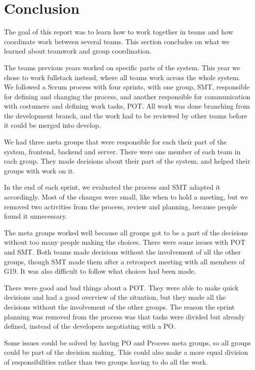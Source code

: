 \section{Conclusion}
The goal of this report was to learn how to work together in teams and how coordinate work between several teams. This section concludes on what we learned about teamwork and group coordination. 

The teams previous years worked on specific parts of the system. This year we chose to work fullstack instead, where all teams work across the whole system. We followed a Scrum process with four sprints, with one group, \gls{SMT}, responsible for defining and changing the process, and another responsible for communication with costumers and defining work tasks, \gls{POT}. All work was done branching from the development branch, and the work had to be reviewed by other teams before it could be merged into develop. 

We had three meta groups that were responsible for each their part of the system, frontend, backend and server. There were one member of each team in each group. They made decisions about their part of the system, and helped their groups with work on it. 

In the end of each sprint, we evaluated the process and \gls{SMT} adapted it accordingly. Most of the changes were small, like when to hold a meeting, but we removed two activities from the process, review and planning, because people found it unnecessary. 

The meta groups worked well because all groups got to be a part of the decisions without too many people making the choices. There were some issues with \gls{POT} and \gls{SMT}. Both teams made decisions without the involvement of all the other groups, though \gls{SMT} made them after a retrospect meeting with all members of \gls{G19}. It was also difficult to follow what choices had been made.

There were good and bad things about a \gls{POT}. They were able to make quick decisions and had a good overview of the situation, but they made all the decisions without the involvement of the other groups. The reason the sprint planning was removed from the process was that tasks were divided but already defined, instead of the developers negotiating with a PO. 

Some issues could be solved by having PO and Process meta groups, so all groups could be part of the decision making. This could also make a more equal division of responsibilities rather than two groups having to do all the work.


